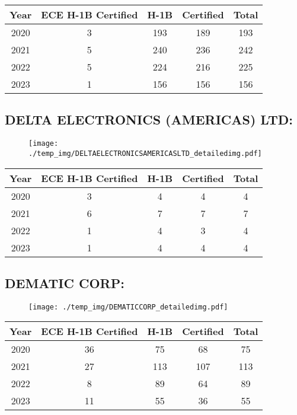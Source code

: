 \documentclass{article}%
\begin{document}
%
\begin{longtable}{c|c|c|c|c}%
\hline%
Year&ECE H{-}1B Certified&H{-}1B&Certified&Total\\%
\hline%
2020&3&193&189&193\\%
\hline%
2021&5&240&236&242\\%
\hline%
2022&5&224&216&225\\%
\hline%
2023&1&156&156&156\\%
\hline%
\end{longtable}

%
\newpage%
\subsection{DELTA ELECTRONICS (AMERICAS) LTD:}%
\label{subsec:DELTAELECTRONICS(AMERICAS)LTD}%
\label{DELTAELECTRONICSAMERICASLTDdetailed}%


\begin{figure}[htbp]%
\centering%
\texttt{[image: ./temp\_img/DELTAELECTRONICSAMERICASLTD\_detailedimg.pdf]}%
\end{figure}

%
\begin{longtable}{c|c|c|c|c}%
\hline%
Year&ECE H{-}1B Certified&H{-}1B&Certified&Total\\%
\hline%
2020&3&4&4&4\\%
\hline%
2021&6&7&7&7\\%
\hline%
2022&1&4&3&4\\%
\hline%
2023&1&4&4&4\\%
\hline%
\end{longtable}

%
\newpage%
\subsection{DEMATIC CORP:}%
\label{subsec:DEMATICCORP}%
\label{DEMATICCORPdetailed}%


\begin{figure}[htbp]%
\centering%
\texttt{[image: ./temp\_img/DEMATICCORP\_detailedimg.pdf]}%
\end{figure}

%
\begin{longtable}{c|c|c|c|c}%
\hline%
Year&ECE H{-}1B Certified&H{-}1B&Certified&Total\\%
\hline%
2020&36&75&68&75\\%
\hline%
2021&27&113&107&113\\%
\hline%
2022&8&89&64&89\\%
\hline%
2023&11&55&36&55\\%
\hline%
\end{longtable}
\end{document}

